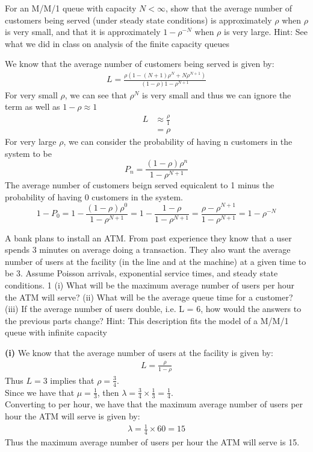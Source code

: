 \documentclass[answers,12pt,addpoints]{exam}
\begin{document}
\begin{questions}
    For an M/M/1 queue with capacity \(N < \infty\), show that the average number of customers being
    served (under steady state conditions) is approximately \(\rho\) when \(\rho\) is very small, and that it is
    approximately \(1 - \rho^{-N}\) when \(\rho\) is very large.
    Hint: See what we did in class on analysis of the finite capacity queues
    \begin{solution}
        We know that the average number of customers being served is given by:
        \begin{align*}
            L = \frac{\rho(1-(N+1)\rho^N + N\rho^{N+1})}{(1-\rho)1-\rho^{N+1}}
        \end{align*}
        For very small $\rho$, we can see that $\rho^N$ is very small and thus we can ignore the term as well as $1-\rho \approx 1$
        \begin{align*}
            L &\approx \frac{\rho}{1}\\
            &= \rho
        \end{align*}
        For very large $\rho$, we can consider the probability of having n customers in the system to be
        $$ P_n = \frac{(1-\rho)\rho^n}{1-\rho^{N+1}}$$
       The average number of customers beign served equicalent to 1 minus the probability of having 0 customers in the system.
       $$1 - P_0 = 1 - \frac{(1-\rho)\rho^0}{1-\rho^{N+1}} = 1 - \frac{1-\rho}{1-\rho^{N+1}} = \frac{\rho - \rho^{N+1}}{1-\rho^{N+1}} =  1 - \rho^{-N}$$
    \end{solution}

    \question 
    A bank plans to install an ATM. From past experience they know that a user spends 3 minutes on
average doing a transaction. They also want the average number of users at the facility (in the line
and at the machine) at a given time to be 3. Assume Poisson arrivals, exponential service times,
and steady state conditions.
1
(i) What will be the maximum average number of users per hour the ATM will serve?
(ii) What will be the average queue time for a customer?
(iii) If the average number of users double, i.e. L = 6, how would the answers to the previous
parts change?
Hint: This description fits the model of a M/M/1 queue with infinite capacity

\begin{solution}
    \textbf{(i)} We know that the average number of users at the facility is given by:
    \begin{align*}
        L = \frac{\rho}{1 - \rho}
    \end{align*}
    Thus $L = 3$ implies that $\rho = \frac{3}{4}$.\\
    Since we have that $\mu = \frac{1}{3}$, then $\lambda = \frac{3}{4} \times \frac{1}{3} = \frac{1}{4}$.\\
    Converting to per hour, we have that the maximum average number of users per hour the ATM will serve is given by:
    \begin{align*}
        \lambda = \frac{1}{4} \times 60 = 15
    \end{align*}
    Thus the maximum average number of users per hour the ATM will serve is 15.\\


\end{solution}
\end{questions}
\end{document}
